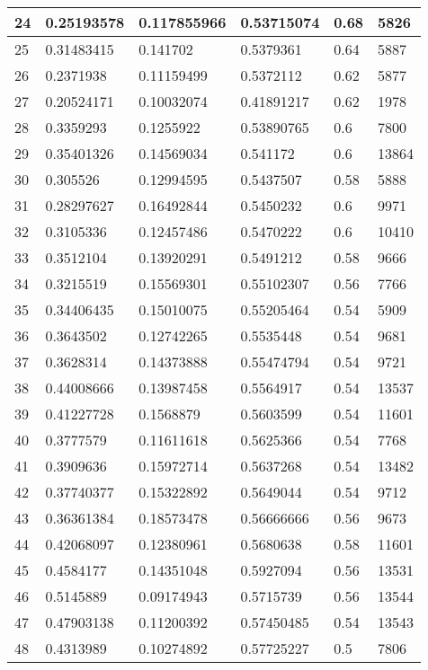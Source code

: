 \begin{longtable}{|l|l|l|l|l|l|}
24 & 0.25193578 & 0.117855966 & 0.53715074 & 0.68 & 5826 \\ \hline 
25 & 0.31483415 & 0.141702 & 0.5379361 & 0.64 & 5887 \\ \hline 
26 & 0.2371938 & 0.11159499 & 0.5372112 & 0.62 & 5877 \\ \hline 
27 & 0.20524171 & 0.10032074 & 0.41891217 & 0.62 & 1978 \\ \hline 
28 & 0.3359293 & 0.1255922 & 0.53890765 & 0.6 & 7800 \\ \hline 
29 & 0.35401326 & 0.14569034 & 0.541172 & 0.6 & 13864 \\ \hline 
30 & 0.305526 & 0.12994595 & 0.5437507 & 0.58 & 5888 \\ \hline 
31 & 0.28297627 & 0.16492844 & 0.5450232 & 0.6 & 9971 \\ \hline 
32 & 0.3105336 & 0.12457486 & 0.5470222 & 0.6 & 10410 \\ \hline 
33 & 0.3512104 & 0.13920291 & 0.5491212 & 0.58 & 9666 \\ \hline 
34 & 0.3215519 & 0.15569301 & 0.55102307 & 0.56 & 7766 \\ \hline 
35 & 0.34406435 & 0.15010075 & 0.55205464 & 0.54 & 5909 \\ \hline 
36 & 0.3643502 & 0.12742265 & 0.5535448 & 0.54 & 9681 \\ \hline 
37 & 0.3628314 & 0.14373888 & 0.55474794 & 0.54 & 9721 \\ \hline 
38 & 0.44008666 & 0.13987458 & 0.5564917 & 0.54 & 13537 \\ \hline 
39 & 0.41227728 & 0.1568879 & 0.5603599 & 0.54 & 11601 \\ \hline 
40 & 0.3777579 & 0.11611618 & 0.5625366 & 0.54 & 7768 \\ \hline 
41 & 0.3909636 & 0.15972714 & 0.5637268 & 0.54 & 13482 \\ \hline 
42 & 0.37740377 & 0.15322892 & 0.5649044 & 0.54 & 9712 \\ \hline 
43 & 0.36361384 & 0.18573478 & 0.56666666 & 0.56 & 9673 \\ \hline 
44 & 0.42068097 & 0.12380961 & 0.5680638 & 0.58 & 11601 \\ \hline 
45 & 0.4584177 & 0.14351048 & 0.5927094 & 0.56 & 13531 \\ \hline 
46 & 0.5145889 & 0.09174943 & 0.5715739 & 0.56 & 13544 \\ \hline 
47 & 0.47903138 & 0.11200392 & 0.57450485 & 0.54 & 13543 \\ \hline 
48 & 0.4313989 & 0.10274892 & 0.57725227 & 0.5 & 7806 \\ \hline 

\end{longtable}
